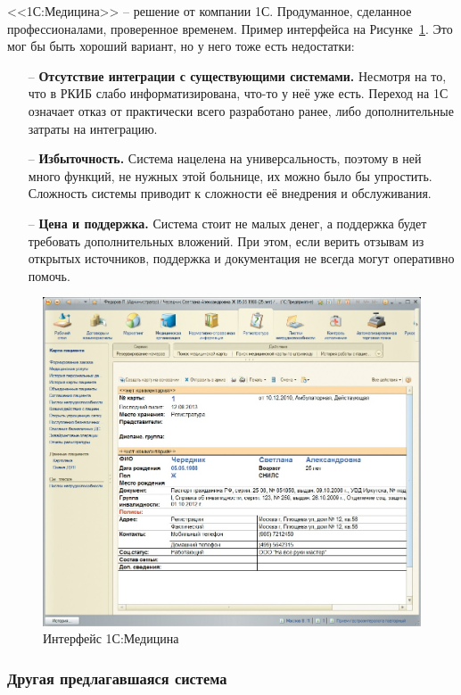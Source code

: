 \documentclass[a4paper,article]{article}
\begin{document}
        <<1С:Медицина>> -- решение от компании 1С. Продуманное, сделанное профессионалами, проверенное временем. Пример интерфейса на Рисунке~\ref{fig:Интерфейс 1С:Медицина}. Это мог бы быть хороший вариант, но у него тоже есть недостатки:

        \begin{itemize}[nolistsep]
            \item[--] \textbf{Отсутствие интеграции с существующими системами.} Несмотря на то, что в РКИБ слабо информатизирована, что-то у неё уже есть. Переход на 1С означает отказ от практически всего разработано ранее, либо дополнительные затраты на интеграцию.
            \item[--] \textbf{Избыточность.} Система нацелена на универсальность, поэтому в ней много функций, не нужных этой больнице, их можно было бы упростить. Сложность системы приводит к сложности её внедрения и обслуживания.
            \item[--] \textbf{Цена и поддержка.} Система стоит не малых денег, а поддержка будет требовать дополнительных вложений. При этом, если верить отзывам из открытых источников, поддержка и документация не всегда могут оперативно помочь.
        \end{itemize}

        \begin{figure}[h]

            \centering

            \includegraphics[width=0.6\linewidth]{Интерфейс 1С:Медицина.png}

            \caption{\centering Интерфейс 1С:Медицина}

            \label{fig:Интерфейс 1С:Медицина}

        \end{figure}

    \subsubsection{Другая предлагавшаяся система}
\end{document}
